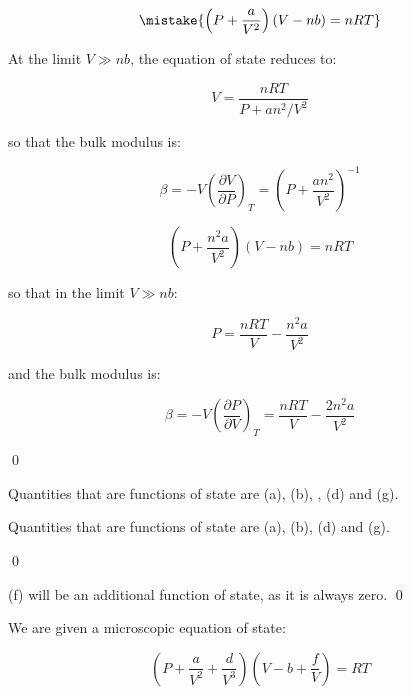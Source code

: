 \documentclass[12pt]{article}
\begin{document}
\begin{equation}
    \mistake{\left( P + \frac{a}{V^{2}} \right) (V - nb) = nRT}
\end{equation}

At the limit $V \gg nb$, the equation of state reduces to:

\begin{equation}
    V = \frac{nRT}{P + an^{2}/V^{2}}
\end{equation}

so that the bulk modulus is:

\begin{equation}
    \beta = -V \left( \frac{\partial V}{\partial P} \right)_{T} = \left( P + \frac{an^{2}}{V^{2}} \right)^{-1}
\end{equation}

\begin{correction}
    \begin{equation}
        \left( P + \frac{n^{2}a}{V^{2}} \right) (V - nb) = nRT
    \end{equation}

    so that in the limit $V \gg nb$:

    \begin{equation}
        P = \frac{nRT}{V} - \frac{n^{2}a}{V^{2}}
    \end{equation}

    and the bulk modulus is:

    \begin{equation}
        \beta = -V \left( \frac{\partial P}{\partial V} \right)_{T} = \frac{nRT}{V} - \frac{2n^{2}a}{V^{2}}
    \end{equation}
\end{correction}
\qed


Quantities that are functions of state are (a), (b), , (d) and (g).

\begin{correction}
    Quantities that are functions of state are (a), (b), (d) and (g).
\end{correction}
\qed


(f) will be an additional function of state, as it is always zero.
\qed


We are given a microscopic equation of state:

\begin{equation}
    \left( P + \frac{a}{V^{2}} + \frac{d}{V^{3}} \right) \left( V - b + \frac{f}{V} \right) = RT
\end{equation}
\end{document}

